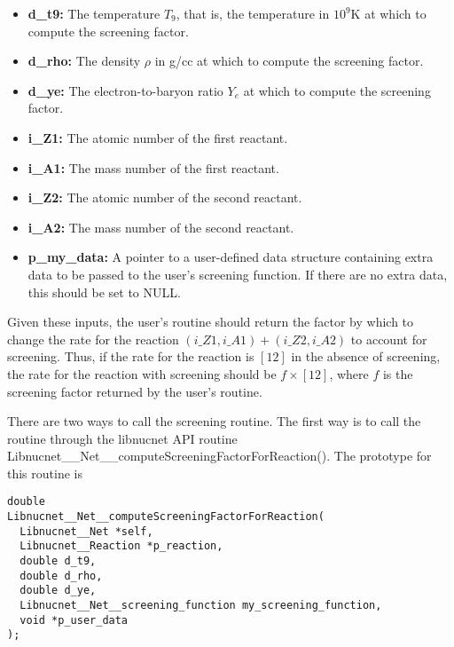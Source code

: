\documentclass{article}    %
\begin{document}
\begin{itemize}

\item {\bf d\_t9:} The temperature $T_9$, that is, the temperature
in $10^9$K at which to compute the screening factor.

\item {\bf d\_rho:} The density $\rho$ in g/cc at which to compute the screening
factor.

\item {\bf d\_ye:} The electron-to-baryon ratio $Y_e$ at which to compute the
screening factor.

\item {\bf i\_Z1:}  The atomic number of the first reactant.

\item {\bf i\_A1:}  The mass number of the first reactant.

\item {\bf i\_Z2:}  The atomic number of the second reactant.

\item {\bf i\_A2:}  The mass number of the second reactant.

\item {\bf p\_my\_data:}  A pointer to a user-defined data structure containing
extra data to be passed to the user's screening function.  If there are
no extra data, this should be set to NULL.

\end{itemize}

Given these inputs, the user's routine should return the factor by which
to change the rate for the reaction $(i\_Z1,i\_A1) + (i\_Z2,i\_A2)$ to
account for screening.  Thus, if the rate for the reaction is $[12]$ in the
absence of screening, the rate for the reaction with screening should be
$f \times [12]$, where $f$ is the screening factor returned by
the user's routine.

There are two ways to call the screening routine.  The first way is to
call the routine through the libnucnet API routine
Libnucnet\_\_Net\_\_computeScreeningFactorForReaction().  The prototype
for this routine is

\begin{verbatim}
double
Libnucnet__Net__computeScreeningFactorForReaction(
  Libnucnet__Net *self,
  Libnucnet__Reaction *p_reaction,
  double d_t9,
  double d_rho,
  double d_ye,
  Libnucnet__Net__screening_function my_screening_function,
  void *p_user_data
);
\end{verbatim}
\end{document}
